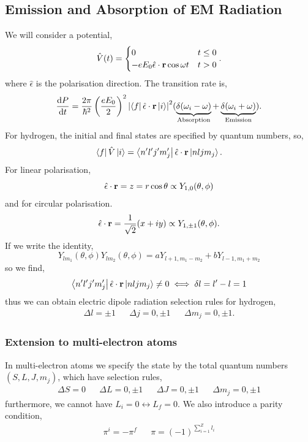 \documentclass{book}
\begin{document}
\subsection{Emission and Absorption of EM Radiation}
We will consider a potential,
\begin{equation}
	\hat{V}(t) = \begin{cases}
		0 & t \leq 0 \\
		-eE_0 \hat{\epsilon} \cdot \vb{r} \cos\omega t & t > 0
	\end{cases}.
\end{equation}
where $\hat{\epsilon}$ is the polarisation direction. The transition rate is,
\begin{equation}
	\dv{P}{t} = \frac{2\pi}{\hbar^2}\left(\frac{eE_0}{2}\right)^2\abs{\bra{f}\hat{\epsilon}\cdot\vb{r}\ket{i}}^2(\underbrace{\delta(\omega_i - \omega)}_{\text{Absorption}} + \underbrace{\delta(\omega_i + \omega)}_{\text{Emission}}).
\end{equation}
For hydrogen, the initial and final states are specified by quantum numbers, so,
\begin{equation}
	\bra{f}\hat{V}\ket{i} = \bra{n'l'j'm_j'}\hat{\epsilon}\cdot\vb{r}\ket{nljm_{j}}.
\end{equation}
For linear polarisation, 
\begin{equation}
	\hat{\epsilon}\cdot\vb{r} = z = r\cos\theta \propto Y_{1,0}(\theta,\phi)
\end{equation}
and for circular polarisation.
\begin{equation}
	\hat{\epsilon}\cdot\vb{r} = \frac{1}{\sqrt{2}}(x + iy) \propto Y_{1,\pm1}(\theta,\phi).
\end{equation}
If we write the identity,
\begin{equation}
	Y_{lm_1}(\theta,\phi)Y_{lm_2}(\theta,\phi) = aY_{l+1, m_1 - m_2} + bY_{l-1, m_1 + m_2}
\end{equation}
so we find,
\begin{equation}
	\bra{n'l'j'm_j'}\hat{\epsilon}\cdot\vb{r}\ket{nljm_{j}} \neq 0 \iff \delta l = l' - l = 1
\end{equation}
thus we can obtain electric dipole radiation selection rules for hydrogen,
\begin{align}
	\Delta l = \pm 1 && \Delta j = 0, \pm 1 && \Delta m_j = 0, \pm 1.
\end{align}
\subsubsection{Extension to multi-electron atoms}
In multi-electron atoms we specify the state by the total quantum numbers $(S, L, J, m_j)$, which have selection rules,
\begin{align}
	\Delta S = 0 && \Delta L = 0, \pm 1 && \Delta J = 0, \pm 1 && \Delta m_j = 0, \pm 1
\end{align}
furthermore, we cannot have $L_i = 0 \leftrightarrow L_f = 0$. We also introduce a parity condition,
\begin{align}
	\pi^i = - \pi^f && \pi= (-1)^{\sum_{i=1}^{Z}l_i}
\end{align}
\end{document}

